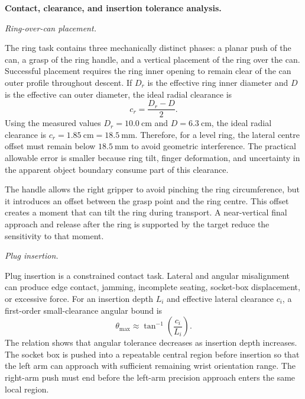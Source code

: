 \medskip
\noindent\textbf{Contact, clearance, and insertion tolerance analysis.}

\smallskip
\noindent\emph{Ring-over-can placement.}

The ring task contains three mechanically distinct phases: a planar push of the can, a grasp of the ring handle, and a vertical placement of the ring over the can. Successful placement requires the ring inner opening to remain clear of the can outer profile throughout descent. If \(D_r\) is the effective ring inner diameter and \(D\) is the effective can outer diameter, the ideal radial clearance is
\begin{equation}
c_r=\frac{D_r-D}{2}.
\label{eq:ch4-ring-clearance}
\end{equation}
Using the measured values \(D_r=10.0~\mathrm{cm}\) and \(D=6.3~\mathrm{cm}\), the ideal radial clearance is \(c_r=1.85~\mathrm{cm}=18.5~\mathrm{mm}\). Therefore, for a level ring, the lateral centre offset must remain below \(18.5~\mathrm{mm}\) to avoid geometric interference. The practical allowable error is smaller because ring tilt, finger deformation, and uncertainty in the apparent object boundary consume part of this clearance.

The handle allows the right gripper to avoid pinching the ring circumference, but it introduces an offset between the grasp point and the ring centre. This offset creates a moment that can tilt the ring during transport. A near-vertical final approach and release after the ring is supported by the target reduce the sensitivity to that moment.

\smallskip
\noindent\emph{Plug insertion.}

Plug insertion is a constrained contact task. Lateral and angular misalignment can produce edge contact, jamming, incomplete seating, socket-box displacement, or excessive force. For an insertion depth \(L_i\) and effective lateral clearance \(c_i\), a first-order small-clearance angular bound is
\begin{equation}
\theta_{\max}\approx\tan^{-1}\left(\frac{c_i}{L_i}\right).
\label{eq:ch4-angular-tolerance}
\end{equation}
The relation shows that angular tolerance decreases as insertion depth increases. The socket box is pushed into a repeatable central region before insertion so that the left arm can approach with sufficient remaining wrist orientation range. The right-arm push must end before the left-arm precision approach enters the same local region.

